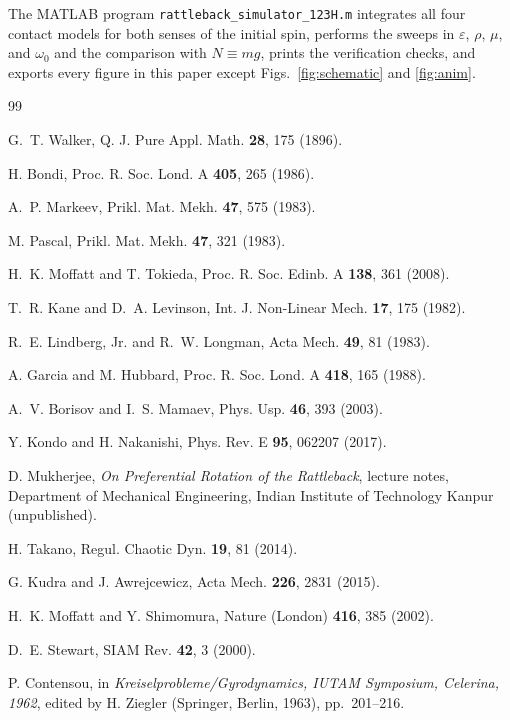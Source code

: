 \documentclass[aps,pre,twocolumn,superscriptaddress,amsmath,amssymb,floatfix,nofootinbib]{revtex4-2}
\begin{document}
The MATLAB program \texttt{rattleback\_simulator\_123H.m} integrates all four contact
models for both senses of the initial spin, performs the sweeps in $\varepsilon$, $\rho$,
$\mu$, and $\omega_0$ and the comparison with $N\equiv mg$, prints the verification
checks, and exports every figure in this paper except Figs.~\ref{fig:schematic} and
\ref{fig:anim}.

\begin{thebibliography}{99}

 G.~T. Walker, Q. J. Pure Appl. Math. \textbf{28}, 175 (1896).

 H. Bondi, Proc. R. Soc. Lond. A \textbf{405}, 265 (1986).

 A.~P. Markeev, Prikl. Mat. Mekh. \textbf{47}, 575 (1983).

 M. Pascal, Prikl. Mat. Mekh. \textbf{47}, 321 (1983).

 H.~K. Moffatt and T. Tokieda, Proc. R. Soc. Edinb. A \textbf{138}, 361 (2008).

 T.~R. Kane and D.~A. Levinson, Int. J. Non-Linear Mech. \textbf{17}, 175 (1982).

 R.~E. Lindberg, Jr. and R.~W. Longman, Acta Mech. \textbf{49}, 81 (1983).

 A. Garcia and M. Hubbard, Proc. R. Soc. Lond. A \textbf{418}, 165 (1988).

 A.~V. Borisov and I.~S. Mamaev, Phys. Usp. \textbf{46}, 393 (2003).

 Y. Kondo and H. Nakanishi, Phys. Rev. E \textbf{95}, 062207 (2017).

 D. Mukherjee, \textit{On Preferential Rotation of the Rattleback},
lecture notes, Department of Mechanical Engineering, Indian Institute of Technology Kanpur
(unpublished).

 H. Takano, Regul. Chaotic Dyn. \textbf{19}, 81 (2014).

 G. Kudra and J. Awrejcewicz, Acta Mech. \textbf{226}, 2831 (2015).

 H.~K. Moffatt and Y. Shimomura, Nature (London) \textbf{416}, 385 (2002).

 D.~E. Stewart, SIAM Rev. \textbf{42}, 3 (2000).

 P. Contensou, in \textit{Kreiselprobleme/Gyrodynamics, IUTAM
Symposium, Celerina, 1962}, edited by H. Ziegler (Springer, Berlin, 1963), pp.~201--216.


\end{thebibliography}
\end{document}
